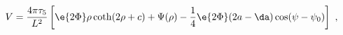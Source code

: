 \begin{equation}
\label{V_new}
  V= \frac{4\pi\tau_5}{L^2} \left[ 
  \e{2\Phi} \rho \coth(2\rho+c) + \Psi(\rho) - \frac14 \e{2\Phi}(
  2a -\da) \cos(\psi-\psi_0) \right]~,
\end{equation}

